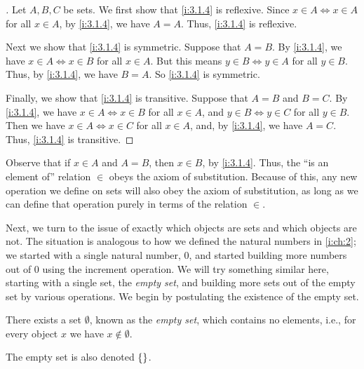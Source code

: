 \begin{proof}[]
  Let \(A, B, C\) be sets.
  We first show that \cref{i:3.1.4} is reflexive.
  Since \(x \in A \iff x \in A\) for all \(x \in A\), by \cref{i:3.1.4}, we have \(A = A\).
  Thus, \cref{i:3.1.4} is reflexive.

  Next we show that \cref{i:3.1.4} is symmetric.
  Suppose that \(A = B\).
  By \cref{i:3.1.4}, we have \(x \in A \iff x \in B\) for all \(x \in A\).
  But this means \(y \in B \iff y \in A\) for all \(y \in B\).
  Thus, by \cref{i:3.1.4}, we have \(B = A\).
  So \cref{i:3.1.4} is symmetric.

  Finally, we show that \cref{i:3.1.4} is transitive.
  Suppose that \(A = B\) and \(B = C\).
  By \cref{i:3.1.4}, we have \(x \in A \iff x \in B\) for all \(x \in A\), and \(y \in B \iff y \in C\) for all \(y \in B\).
  Then we have \(x \in A \iff x \in C\) for all \(x \in A\), and, by \cref{i:3.1.4}, we have \(A = C\).
  Thus, \cref{i:3.1.4} is transitive.
\end{proof}

\begin{note}
  Observe that if \(x \in A\) and \(A = B\), then \(x \in B\), by \cref{i:3.1.4}.
  Thus, the ``is an element of'' relation \(\in\) obeys the axiom of substitution.
  Because of this, any new operation we define on sets will also obey the axiom of substitution, as long as we can define that operation purely in terms of the relation \(\in\).
\end{note}

\begin{note}
  Next, we turn to the issue of exactly which objects are sets and which objects are not.
  The situation is analogous to how we defined the natural numbers in \cref{i:ch:2};
  we started with a single natural number, \(0\), and started building more numbers out of \(0\) using the increment operation.
  We will try something similar here, starting with a single set, the \emph{empty set},
  and building more sets out of the empty set by various operations.
  We begin by postulating the existence of the empty set.
\end{note}

\begin{ax}\label{i:3.2}
  There exists a set \(\emptyset\), known as the \emph{empty set}, which contains no elements, i.e., for every object \(x\) we have \(x \notin \emptyset\).
\end{ax}

\begin{note}
  The empty set is also denoted \(\left\lbrace\right\rbrace\).
\end{note}


